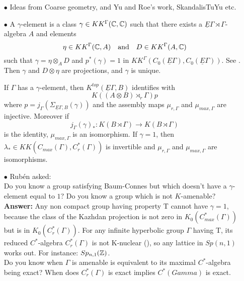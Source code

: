 \begin{itemize}
\item[$\bullet$] Ideas from Coarse geometry, and Yu and Roe's work, SkandalisTuYu etc.\\

\item[$\bullet$] A $\gamma$-element is a class $\gamma \in KK^\Gamma(\mathbb C,\mathbb C)$ such that there exists a $\underline E \Gamma \rtimes \Gamma$-algebra $A$ and elements 
\[ \eta\in KK^\Gamma(\mathbb C,A) \quad \text{and}\quad D\in KK^\Gamma(A,\mathbb C)\]
such that $\gamma = \eta \otimes_A D$ and $p^*(\gamma)=1$ in $KK^\Gamma(C_0(\underline E\Gamma),C_0(\underline E\Gamma))$. See \cite{TuNovikov}.\\

Then $\gamma$ and $D\otimes \eta$ are projections, and $\gamma$ is unique. \\

\begin{thm}
If $\Gamma$ has a $\gamma$-element, then $K^{top}(\underline E\Gamma,B)$ identifies with 
\[K((A\otimes B)\rtimes_r \Gamma) p\]
where $p= j_\Gamma(\Sigma_{\underline E \Gamma, B}(\gamma))$ and the assembly maps $\mu_{r,\Gamma}$ and $\mu_{max,\Gamma}$ are injective. Moreover if
\[j_\Gamma(\gamma)_* : K(B\rtimes\Gamma) \rightarrow K(B\rtimes \Gamma) \]
is the identity, $\mu_{max,\Gamma}$ is an isomorphism. If $\gamma=1$, then $\lambda_*\in KK(C_{max}(\Gamma), C^*_r(\Gamma))$ is invertible and $\mu_{r,\Gamma}$ and $\mu_{max,\Gamma}$ are isomorphisms.\\
\end{thm}

\item[$\bullet$] Rub\'en asked: \\

Do you know a group satisfying Baum-Connes but which doesn't have a $\gamma$-element equal to $1$?   Do you know a group which is not $K$-amenable? \\

\textbf{Answer:} Any non compact group having property T cannot have $\gamma=1$, because the class of the Kazhdan projection is not zero in $K_0(C_{max}^*(\Gamma))$ but is in $K_0(C_{r}^*(\Gamma))$. For any infinite hyperbolic group $\Gamma$ having T, its reduced $C^*$-algebra $C^*_r(\Gamma)$ is not K-nuclear (\cite{skandalis1988notion}), so any lattice in $Sp(n,1)$ works out. For instance: $Sp_{n,1}(\mathbb Z)$.\\

Do you know when $\Gamma$ is amenable is equivalent to its maximal $C^*$-algebra being exact? When does $C_r^*(\Gamma)$ is exact implies $C^*(Gamma)$ is exact.\\


\end{itemize}
